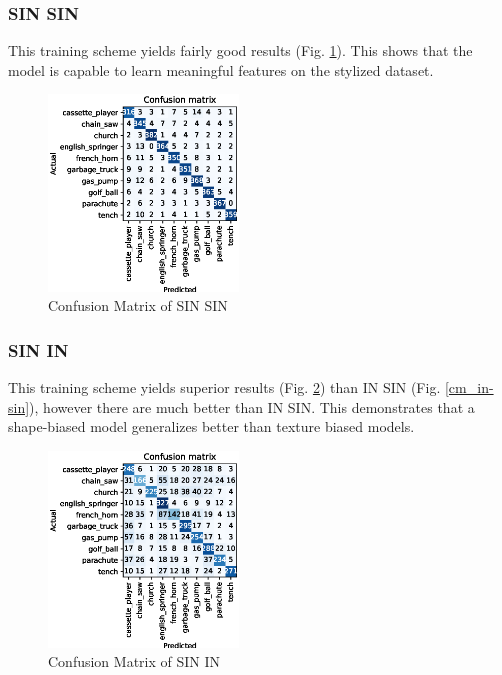 \documentclass{article}
\begin{document}
\subsubsection{SIN \texorpdfstring{\textrightarrow} .SIN}
This training scheme yields fairly good results (Fig. \ref{cm_sin-sin}). This shows that the model is capable to learn
meaningful features on the stylized dataset.

\begin{figure}[h!]
  \includegraphics[width = 0.45\textwidth]{imgs/sin/sin-sin/sin-sin_confusion_matrix_0.908.eps}
  \caption{Confusion Matrix of SIN \texorpdfstring{\textrightarrow} .SIN}
  \label{cm_sin-sin}
\end{figure}

\subsubsection{SIN \texorpdfstring{\textrightarrow} .IN}

This training scheme yields superior results (Fig. \ref{cm_sin-in}) than IN \texorpdfstring{\textrightarrow} .SIN (Fig. \ref{cm_in-sin}), however
there are much better than IN \texorpdfstring{\textrightarrow} .SIN.
This demonstrates that a shape-biased model generalizes better than texture biased models.

\begin{figure}[h!]
  \includegraphics[width = 0.45\textwidth]{imgs/sin/sin-in/sin-in_confusion_matrix_0.624.eps}
  \caption{Confusion Matrix of SIN \texorpdfstring{\textrightarrow} .IN}
  \label{cm_sin-in}
\end{figure}
\end{document}
